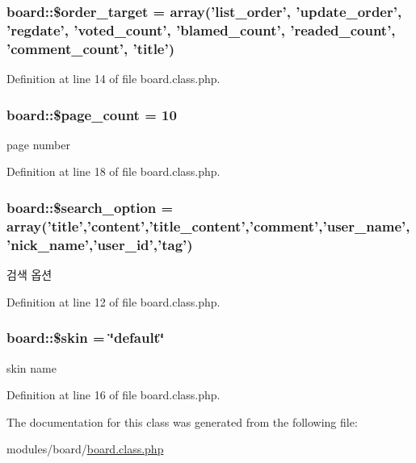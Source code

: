 \hypertarget{classboard_a66d1965fe6a51e8143499adeaf3998cc}{
\subsubsection[{\$order\+\_\+target}]{\setlength{\rightskip}{0pt plus 5cm}board\+::\$order\+\_\+target = array('list\+\_\+order', 'update\+\_\+order', 'regdate', 'voted\+\_\+count', 'blamed\+\_\+count', 'readed\+\_\+count', 'comment\+\_\+count', '{\bf title}')}}\label{classboard_a66d1965fe6a51e8143499adeaf3998cc}


Definition at line 14 of file board.\+class.\+php.

\hypertarget{classboard_ab5d2d3925f753039483da2c65076122b}{
\subsubsection[{\$page\+\_\+count}]{\setlength{\rightskip}{0pt plus 5cm}board\+::\$page\+\_\+count = 10}}\label{classboard_ab5d2d3925f753039483da2c65076122b}


page number 



Definition at line 18 of file board.\+class.\+php.

\hypertarget{classboard_a6affe0c86966ebd06572cc4c8abde32b}{
\subsubsection[{\$search\+\_\+option}]{\setlength{\rightskip}{0pt plus 5cm}board\+::\$search\+\_\+option = array('{\bf title}','{\bf content}','title\+\_\+content','{\bf comment}','user\+\_\+name','nick\+\_\+name','user\+\_\+id','{\bf tag}')}}\label{classboard_a6affe0c86966ebd06572cc4c8abde32b}


검색 옵션 



Definition at line 12 of file board.\+class.\+php.

\hypertarget{classboard_ac7e864ad1db563c4d3f97291dd90291f}{
\subsubsection[{\$skin}]{\setlength{\rightskip}{0pt plus 5cm}board\+::\$skin = \char`\"{}default\char`\"{}}}\label{classboard_ac7e864ad1db563c4d3f97291dd90291f}


skin name 



Definition at line 16 of file board.\+class.\+php.



The documentation for this class was generated from the following file\+:\begin{DoxyCompactItemize}
\item 
modules/board/\hyperlink{board_8class_8php}{board.\+class.\+php}\end{DoxyCompactItemize}
